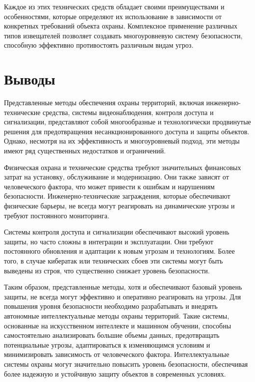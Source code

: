 Каждое из этих технических средств обладает своими преимуществами и особенностями, которые определяют их использование в зависимости от конкретных требований объекта охраны. Комплексное применение различных типов извещателей позволяет создавать многоуровневую систему безопасности, способную эффективно противостоять различным видам угроз.


\section{Выводы} \label{ch1:conclusion}
Представленные методы обеспечения охраны территорий, включая инженерно-технические средства, системы видеонаблюдения, контроля доступа и сигнализации, представляют собой многообразные и технологически продвинутые решения для предотвращения несанкционированного доступа и защиты объектов. Однако, несмотря на их эффективность и многоуровневый подход, эти методы имеют ряд существенных недостатков и ограничений.

Физическая охрана и технические средства требуют значительных финансовых затрат на установку, обслуживание и модернизацию. Они также зависят от человеческого фактора, что может привести к ошибкам и нарушениям безопасности. Инженерно-технические заграждения, которые обеспечивают физические барьеры, не всегда могут реагировать на динамические угрозы и требуют постоянного мониторинга.

Системы контроля доступа и сигнализации обеспечивают высокий уровень защиты, но часто сложны в интеграции и эксплуатации. Они требуют постоянного обновления и адаптации к новым угрозам и технологиям. Более того, в случае кибератак или технических сбоев эти системы могут быть выведены из строя, что существенно снижает уровень безопасности.

Таким образом, представленные методы, хотя и обеспечивают базовый уровень защиты, не всегда могут эффективно и оперативно реагировать на угрозы. Для повышения уровня безопасности необходимо разрабатывать и внедрять автономные интеллектуальные методы охраны территорий. Такие системы, основанные на искусственном интеллекте и машинном обучении, способны самостоятельно анализировать большие объемы данных, предотвращать потенциальные угрозы, адаптироваться к изменяющимся условиям и минимизировать зависимость от человеческого фактора. Интеллектуальные системы охраны могут значительно повысить уровень безопасности, обеспечивая более надежную и устойчивую защиту объектов в современных условиях.

%
